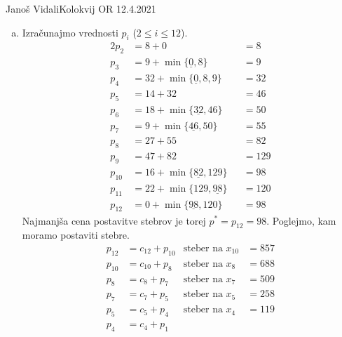 \begin{naloga}{Janoš Vidali}{Kolokvij OR 12.4.2021}
\begin{odgovor}
\begin{enumerate}[(a)]
\item Izračunajmo vrednosti $p_i$ ($2 \le i \le 12$).
\begin{alignat*}{2}
p_2    &=  8 + 0                           &&= 8  \\
p_3    &=  9 + \min\{\underline{0}, 8\}    &&= 9  \\
p_4    &= 32 + \min\{\underline{0}, 8, 9\} &&= 32  \\
p_5    &= 14 + 32                          &&= 46 \\
p_6    &= 18 + \min\{\underline{32}, 46\}  &&= 50 \\
p_7    &=  9 + \min\{\underline{46}, 50\}  &&= 55 \\
p_8    &= 27 + 55                          &&= 82 \\
p_9    &= 47 + 82                          &&= 129 \\
p_{10} &= 16 + \min\{\underline{82}, 129\} &&= 98 \\
p_{11} &= 22 + \min\{129, \underline{98}\} &&= 120 \\
p_{12} &=  0 + \min\{\underline{98}, 120\} &&= 98
\end{alignat*}
Najmanjša cena postavitve stebrov je torej $p^* = p_{12} = 98$.
Poglejmo, kam moramo postaviti stebre.
\begin{align*}
p_{12} &= c_{12} + p_{10} & \text{steber na } x_{10} &= 857 \\
p_{10} &= c_{10} + p_8    & \text{steber na } x_8    &= 688 \\
p_8    &= c_8    + p_7    & \text{steber na } x_7    &= 509 \\
p_7    &= c_7    + p_5    & \text{steber na } x_5    &= 258 \\
p_5    &= c_5    + p_4    & \text{steber na } x_4    &= 119 \\
p_4    &= c_4    + p_1
\end{align*}
\end{enumerate}
\end{odgovor}
\end{naloga}
